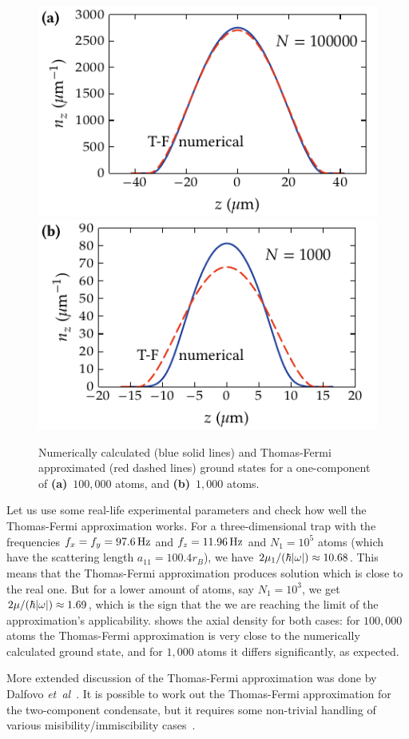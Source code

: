 \begin{figure}
\centerline{%
	\includegraphics{figures_generated/mean_field/one_comp_gs_large.pdf}%
	\includegraphics{figures_generated/mean_field/one_comp_gs_small.pdf}}
\caption[Numerically calculated and Thomas-Fermi approximated ground states]{Numerically calculated (blue solid lines) and Thomas-Fermi approximated (red dashed lines) ground states for a one-component \Rb{}  of \textbf{(a)}~$100,000$ atoms, and \textbf{(b)}~$1,000$ atoms.}%
\label{fig:bec-noise:mean-field:tf-vs-accurate}
\end{figure}

Let us use some real-life experimental parameters and check how well the Thomas-Fermi approximation works.
For a three-dimensional trap with the frequencies $f_x = f_y = 97.6\mbox{\ensuremath{\,\mathrm{Hz}}}$ and $f_z = 11.96\mbox{\ensuremath{\,\mathrm{Hz}}}$ and $N_1=10^5$ \Rb{} atoms (which have the scattering length $a_{11} = 100.4 r_B$), we have $2 \mu_1 / (\hbar |\mathbf{\omega}|) \approx 10.68$.
This means that the Thomas-Fermi approximation produces solution which is close to the real one.
But for a lower amount of atoms, say $N_1=10^3$, we get $2 \mu / (\hbar |\mathbf{\omega}|) \approx 1.69$, which is the sign that the we are reaching the limit of the approximation's applicability.
 shows the axial density for both cases: for $100,000$ atoms the Thomas-Fermi approximation is very close to the numerically calculated ground state, and for $1,000$ atoms it differs significantly, as expected.

More extended discussion of the Thomas-Fermi approximation was done by Dalfovo \textit{et~al}~\cite{Dalfovo1999}.
It is possible to work out the Thomas-Fermi approximation for the two-component condensate, but it requires some non-trivial handling of various misibility/immiscibility cases~\cite{Anderson2010}.
